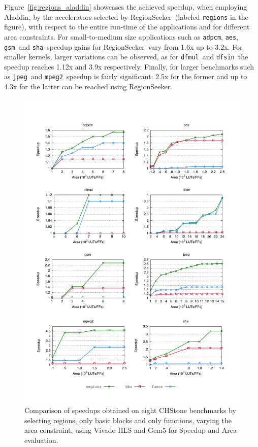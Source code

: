 \documentclass[]{usiinfthesis}
\newcommand{\rseeker}{{RegionSeeker}}
\newcommand{\adpcm}{\texttt{adpcm}}
\newcommand{\sha}{\texttt{sha}}
\newcommand{\jpeg}{\texttt{jpeg}}
\newcommand{\mpeg}{\texttt{mpeg2}}
\newcommand{\aes}{\texttt{aes}}
\newcommand{\dfmul}{\texttt{dfmul}}
\newcommand{\dfsin}{\texttt{dfsin}}
\newcommand{\gsm}{\texttt{gsm}}
\begin{document}
Figure~\ref{fig:regions_aladdin} showcases the achieved
speedup, when employing Aladdin, by the accelerators selected by
\rseeker\ (labeled \texttt{regions} in the figure), with respect to
the entire run-time of the applications and for different area
constraints.  For small-to-medium size applications such as \adpcm,
\aes, \gsm\ and \sha\ speedup gains for \rseeker\ vary from 1.6x up to
3.2x. For smaller kernels, larger variations can be observed, as for
\dfmul\ and \dfsin\ the speedup reaches 1.12x and 3.9x respectively.
Finally, for larger benchmarks such as \jpeg\ and \mpeg\, speedup is
fairly significant: 2.5x for the former and up to 4.3x for the latter
can be reached using \rseeker.\par

\begin{figure}[h!]
\centering
\hspace*{-1cm}
\includegraphics[width= 1.1 \linewidth]{figs/regions_vivado}
\caption{Comparison of speedups obtained on eight CHStone benchmarks
  by selecting regions, only basic blocks and only functions, varying
  the area constraint, using Vivado HLS and Gem5 for Speedup and Area evaluation.}
\label{fig:regions_vivado}
\end{figure}
\end{document}
